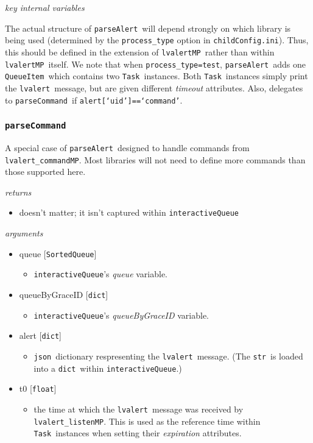 \documentclass{article}
\newcommand{\alert}{\texttt{lvalert}}
\newcommand{\lvalertMP}{\texttt{lvalertMP}}
\newcommand{\lvalertListenMP}{\texttt{lvalert\_listenMP}}
\newcommand{\lvalertCommandMP}{\texttt{lvalert\_commandMP}}
\newcommand{\interactiveQueue}{\texttt{interactiveQueue}}
\newcommand{\parseAlert}{\texttt{parseAlert}}
\newcommand{\parseCommand}{\texttt{parseCommand}}
\newcommand{\SortedQueue}{\texttt{SortedQueue}}
\newcommand{\QueueItem}{\texttt{QueueItem}}
\newcommand{\Task}{\texttt{Task}}
\newcommand{\childConfigini}{\texttt{childConfig.ini}}
\newcommand{\pythonfloat}{\texttt{float}}
\newcommand{\pythonstr}{\texttt{str}}
\newcommand{\pythondict}{\texttt{dict}}
\newcommand{\json}{\texttt{json}}
\begin{document}
\noindent
\textit{key internal variables}

The actual structure of \parseAlert~will depend strongly on which library is being used (determined by the \texttt{process\_type} option in \childConfigini). 
Thus, this should be defined in the extension of \lvalertMP~rather than within \lvalertMP~itself.
We note that when \texttt{process\_type=test}, \parseAlert~adds one \QueueItem~which contains two \Task~instances. 
Both \Task~instances simply print the \alert~message, but are given different \textit{timeout} attributes.
Also, delegates to \parseCommand~if \texttt{alert[`uid']==`command'}.


\subsubsection{\parseCommand}
\label{sec: parseCommand}

A special case of \parseAlert~designed to handle commands from \lvalertCommandMP. 
Most libraries will not need to define more commands than those supported here. 

\vspace{0.5cm}
\noindent
\textit{returns}

\begin{itemize}
    \item{doesn't matter; it isn't captured within \interactiveQueue}
\end{itemize}

\noindent
\textit{arguments}

\begin{itemize}
    \item{queue [\SortedQueue]
        \begin{itemize}
            \item{\interactiveQueue's \textit{queue} variable.}
        \end{itemize}
         }
    \item{queueByGraceID [\pythondict]
        \begin{itemize}
            \item{\interactiveQueue's \textit{queueByGraceID} variable.}
        \end{itemize}
         }
    \item{alert [\pythondict]
        \begin{itemize}
            \item{\json~dictionary respresenting the \alert~message. (The \pythonstr~is loaded into a \pythondict~within \interactiveQueue.)}
        \end{itemize}
         }
    \item{t0 [\pythonfloat]
        \begin{itemize}
            \item{the time at which the \alert~message was received by \lvalertListenMP. This is used as the reference time within \Task~instances when setting their \textit{expiration} attributes.}
        \end{itemize}
         }
\end{itemize}
\end{document}
